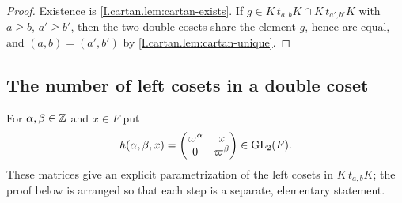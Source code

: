 \begin{theorem}
\end{theorem}
\begin{proof}
Existence is \cref{I.cartan.lem:cartan-exists}. If $g\in K\,t_{a,b}K\cap K\,t_{a',b'}K$ with $a\ge b$, $a'\ge b'$,
then the two double cosets share the element $g$, hence are equal, and $(a,b)=(a',b')$ by
\cref{I.cartan.lem:cartan-unique}.
\end{proof}

\subsection*{The number of left cosets in a double coset}

For $\alpha,\beta\in\mathbb{Z}$ and $x\in F$ put
\[
  h(\alpha,\beta,x)=\begin{pmatrix}\varpi^\alpha&x\\0&\varpi^\beta\end{pmatrix}\in\mathrm{GL}_2(F).
\]
These matrices give an explicit parametrization of the left cosets in $K\,t_{a,b}K$; the proof below is arranged so
that each step is a separate, elementary statement.

